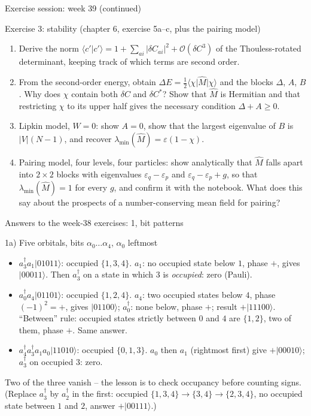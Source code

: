 \documentclass[aspectratio=169,10pt]{beamer}
\newcommand{\ket}[1]{\vert #1\rangle}
\newcommand{\bra}[1]{\langle #1\vert}
\newcommand{\braket}[2]{\langle #1\vert #2\rangle}
\newcommand{\bigO}{\mathcal{O}}
\begin{document}
\begin{frame}{Exercise session: week 39 (continued)}
  \footnotesize
  \begin{block}{Exercise 3: stability (chapter 6, exercise 5a--c, plus the pairing model)}
    \begin{enumerate}
      \item[a)] Derive the norm $\braket{c'}{c'}=1+\sum_{ai}|\delta C_{ai}|^2+\bigO(\delta C^3)$ of the Thouless-rotated determinant, keeping track of which terms are second order.
      \item[b)] From the second-order energy, obtain $\Delta E=\frac12\bra{\chi}\hat{M}\ket{\chi}$ and the blocks $\Delta$, $A$, $B$. Why does $\chi$ contain both $\delta C$ and $\delta C^{*}$? Show that $\hat{M}$ is Hermitian and that restricting $\chi$ to its upper half gives the necessary condition $\Delta+A\ge0$.
      \item[c)] Lipkin model, $W=0$: show $A=0$, show that the largest eigenvalue of $B$ is $|V|(N-1)$, and recover $\lambda_{\min}(\hat{M})=\varepsilon(1-\chi)$.
      \item[d)] Pairing model, four levels, four particles: show analytically that $\hat{M}$ falls apart into $2\times2$ blocks with eigenvalues $\varepsilon_q-\varepsilon_p$ and $\varepsilon_q-\varepsilon_p+g$, so that $\lambda_{\min}(\hat{M})=1$ for every $g$, and confirm it with the notebook. What does this say about the prospects of a number-conserving mean field for pairing?
    \end{enumerate}
  \end{block}
\end{frame}

\begin{frame}{Answers to the week-38 exercises: 1, bit patterns}
  \footnotesize
  \begin{block}{1a) Five orbitals, bits $\alpha_0\dots\alpha_4$, $\alpha_0$ leftmost}
    \begin{itemize}
      \item $a_3^{\dagger}a_1\ket{01011}$: occupied $\{1,3,4\}$. $a_1$: no occupied state below $1$, phase $+$, gives $\ket{00011}$. Then $a_3^{\dagger}$ on a state in which $3$ is \emph{occupied}: \alert{zero} (Pauli).
      \item $a_0^{\dagger}a_4\ket{01101}$: occupied $\{1,2,4\}$. $a_4$: two occupied states below $4$, phase $(-1)^2=+$, gives $\ket{01100}$; $a_0^{\dagger}$: none below, phase $+$; result $+\ket{11100}$. ``Between'' rule: occupied states strictly between $0$ and $4$ are $\{1,2\}$, two of them, phase $+$. Same answer.
      \item $a_4^{\dagger}a_3^{\dagger}a_1a_0\ket{11010}$: occupied $\{0,1,3\}$. $a_0$ then $a_1$ (rightmost first) give $+\ket{00010}$; $a_3^{\dagger}$ on occupied $3$: \alert{zero}.
    \end{itemize}
    Two of the three vanish -- the lesson is to check occupancy before counting signs. (Replace $a_3^{\dagger}$ by $a_2^{\dagger}$ in the first: occupied $\{1,3,4\}\to\{3,4\}\to\{2,3,4\}$, no occupied state between $1$ and $2$, answer $+\ket{00111}$.)
  \end{block}
\end{frame}
\end{document}
